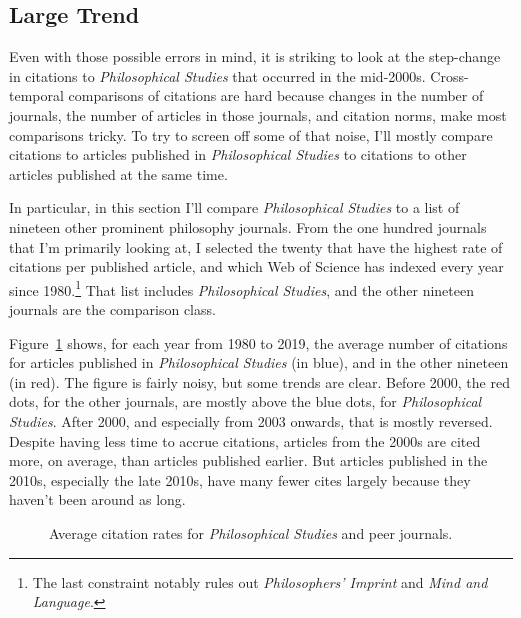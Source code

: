 \documentclass[
  10pt,
  letterpaper,
  DIV=11,
  numbers=noendperiod,
  twoside]{scrartcl}
\begin{document}
\subsection{Large Trend}\label{large-trend}

Even with those possible errors in mind, it is striking to look at the
step-change in citations to \emph{Philosophical Studies} that occurred
in the mid-2000s. Cross-temporal comparisons of citations are hard
because changes in the number of journals, the number of articles in
those journals, and citation norms, make most comparisons tricky. To try
to screen off some of that noise, I'll mostly compare citations to
articles published in \emph{Philosophical Studies} to citations to other
articles published at the same time.

In particular, in this section I'll compare \emph{Philosophical Studies}
to a list of nineteen other prominent philosophy journals. From the one
hundred journals that I'm primarily looking at, I selected the twenty
that have the highest rate of citations per published article, and which
Web of Science has indexed every year since 1980.\footnote{The last
  constraint notably rules out \emph{Philosophers' Imprint} and
  \emph{Mind and Language}.} That list includes \emph{Philosophical
Studies}, and the other nineteen journals are the comparison class.

Figure~\ref{fig-compare-cites-dots} shows, for each year from 1980 to
2019, the average number of citations for articles published in
\emph{Philosophical Studies} (in blue), and in the other nineteen (in
red). The figure is fairly noisy, but some trends are clear. Before
2000, the red dots, for the other journals, are mostly above the blue
dots, for \emph{Philosophical Studies}. After 2000, and especially from
2003 onwards, that is mostly reversed. Despite having less time to
accrue citations, articles from the 2000s are cited more, on average,
than articles published earlier. But articles published in the 2010s,
especially the late 2010s, have many fewer cites largely because they
haven't been around as long.

\begin{figure}


\caption{\label{fig-compare-cites-dots}Average citation rates for
\emph{Philosophical Studies} and peer journals.}

\end{figure}%
\end{document}
